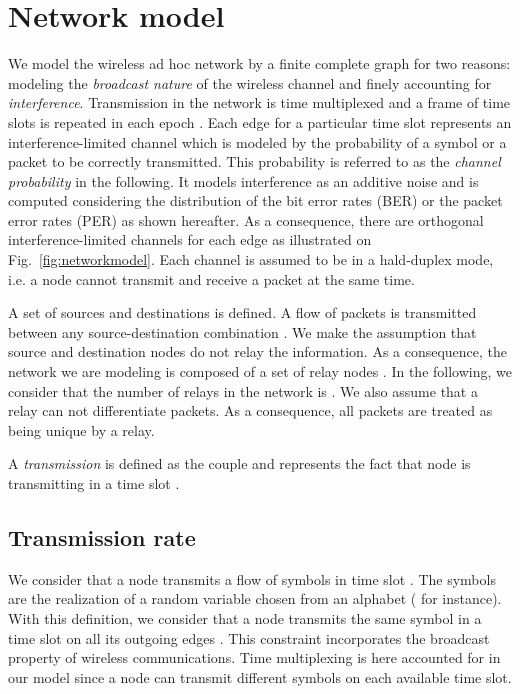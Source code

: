 \documentclass[a4paper]{article}
\begin{document}
\section{Network model}\label{sec:networkmodel}

We model the wireless ad hoc network by a finite complete graph  for two reasons: modeling the \emph{broadcast nature} of the wireless channel and finely accounting for \emph{interference}.
Transmission in the network is time multiplexed and a frame of  time slots is repeated in each epoch . 
Each edge  for a particular time slot  represents an interference-limited channel which is modeled by the probability of a symbol or a packet to be correctly transmitted. This probability is referred to as the \emph{channel probability} in the following. It models interference as an additive noise and is computed considering the distribution of the bit error rates (BER) or the packet error rates (PER) as shown hereafter. As a consequence, there are   orthogonal interference-limited channels for each edge  as illustrated on Fig.~\ref{fig:networkmodel}.
Each channel is assumed to be in a hald-duplex mode, i.e. a node cannot transmit and receive a packet at the same time. 



A set of sources  and destinations  is defined. A flow of packets is transmitted between any source-destination combination . 
We make the assumption that source and destination nodes do not relay the information. As a consequence, the network we are modeling is composed of a set of relay nodes . In the following, we consider that the number of relays in the network is . We also assume that a relay can not differentiate packets. As a consequence, all packets are treated as being unique by a relay.

A \emph{transmission} is defined as the couple  and represents the fact that node  is transmitting in a time slot .



\subsection{Transmission rate}
We consider that a node  transmits a flow of symbols in time slot . The symbols are the realization of a random variable  chosen from an alphabet  ( for instance). With this definition, we consider that a node  transmits the same symbol in a time slot  on all its outgoing edges . This constraint incorporates the broadcast property of wireless communications. Time multiplexing is here accounted for in our model since a node can transmit different symbols on each available time slot. 
 
\end{document}
